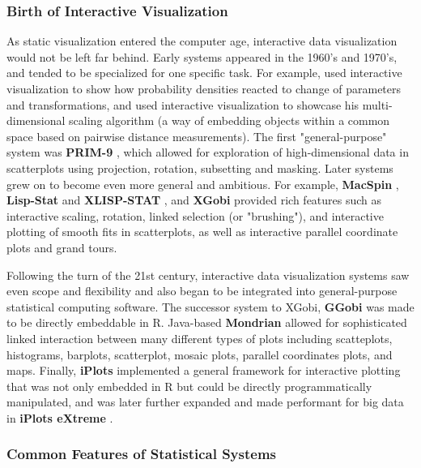\documentclass[12pt,a4paper]{article}
\begin{document}
\subsubsection{Birth of Interactive Visualization}

As static visualization entered the computer age, interactive data visualization would not be left far behind. Early systems appeared in the 1960's and 1970's, and tended to be specialized for one specific task. For example, \cite{fowlkes1969} used interactive visualization to show how probability densities reacted to change of parameters and transformations, and \cite{kruskal1964} used interactive visualization to showcase his multi-dimensional scaling algorithm (a way of embedding objects within a common space based on pairwise distance measurements). The first "general-purpose" system was \textbf{PRIM-9} \citep{fisherkeller1974}, which allowed for exploration of high-dimensional data in scatterplots using projection, rotation, subsetting and masking. Later systems grew on to become even more general and ambitious. For example, \textbf{MacSpin} \citep{donoho1988}, \textbf{Lisp-Stat} and \textbf{XLISP-STAT} \citep{tierney1989, tierney2004}, and \textbf{XGobi} \citep{swayne1998} provided rich features such as interactive scaling, rotation, linked selection (or "brushing"), and interactive plotting of smooth fits in scatterplots, as well as interactive parallel coordinate plots and grand tours.

Following the turn of the 21st century, interactive data visualization systems saw even scope and flexibility and also began to be integrated into general-purpose statistical computing software. The successor system to XGobi, \textbf{GGobi} \citep{swayne2003} was made to be directly embeddable in R. Java-based \textbf{Mondrian} \citep{theus2002} allowed for sophisticated linked interaction between many different types of plots including scatteplots, histograms, barplots, scatterplot, mosaic plots, parallel coordinates plots, and maps. Finally, \textbf{iPlots} \citep{urbanek2003} implemented a general framework for interactive plotting that was not only embedded in R but could be directly programmatically manipulated, and was later further expanded and made performant for big data in \textbf{iPlots eXtreme} \citep{urbanek2011}.

\subsubsection{Common Features of Statistical Systems}
\end{document}
